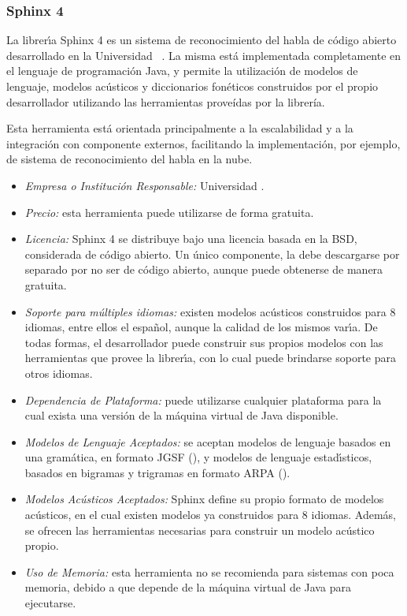 \subsubsection{Sphinx 4}
\label{sec:sphinx}

La librer{\'\i}a Sphinx 4 es un sistema de reconocimiento del habla de c\'odigo abierto desarrollado en
la Universidad \mbox{ \cite{Sphinx4}}. La misma est\'a implementada
completamente en el lenguaje de programaci\'on Java, y permite la utilizaci\'on de modelos de lenguaje,
modelos ac\'usticos y diccionarios fon\'eticos construidos por el propio desarrollador utilizando las
herramientas proveídas por la librer\'ia.

Esta herramienta est\'a orientada principalmente a la escalabilidad y a la integraci\'on con
componente externos, facilitando la implementaci\'on, por ejemplo, de sistema de reconocimiento del
habla en la nube.

\begin{itemize}
	\item \emph{Empresa o Instituci\'on Responsable:} Universidad .
	\item \emph{Precio:} esta herramienta puede utilizarse de forma gratuita.
	\item \emph{Licencia:} Sphinx 4 se distribuye bajo una licencia basada en la BSD, considerada
	de c\'odigo abierto. Un \'unico componente, la  debe descargarse por
	separado por no ser de c\'odigo abierto, aunque puede obtenerse de manera gratuita.
	\item \emph{Soporte para m\'ultiples idiomas:} existen modelos ac\'usticos construidos para
	8 idiomas, entre ellos el espa\~nol, aunque la calidad de los mismos var{\'\i}a.
	De todas formas, el desarrollador puede construir sus propios modelos con las herramientas
	que provee la librer{\'\i}a, con lo cual puede brindarse soporte para otros idiomas.
	\item \emph{Dependencia de Plataforma:} puede utilizarse cualquier plataforma para la cual
	exista una versi\'on de la m\'aquina virtual de Java disponible.
	\item \emph{Modelos de Lenguaje Aceptados:} se aceptan modelos de lenguaje basados en una
        gram\'atica, en formato JGSF (), y modelos de 
        lenguaje estad{\'\i}sticos, basados en bigramas y trigramas en formato ARPA ().
	\item \emph{Modelos Ac\'usticos Aceptados:} Sphinx define su propio formato de modelos ac\'usticos,
	en el cual existen modelos ya construidos para 8 idiomas. Adem\'as, se ofrecen las herramientas
	necesarias para construir un modelo ac\'ustico propio.
	\item \emph{Uso de Memoria:} esta herramienta no se recomienda para sistemas con poca memoria,
	debido a que depende de la m\'aquina virtual de Java para ejecutarse.
\end{itemize}
